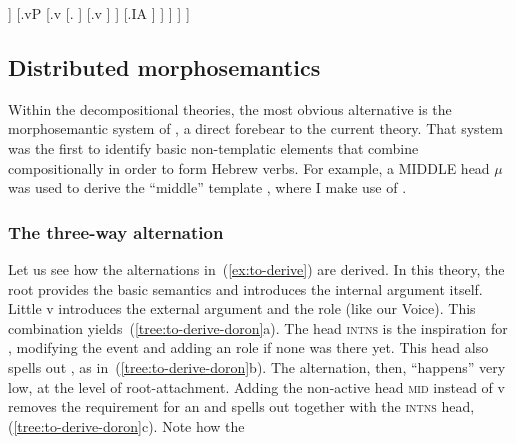 \begin{exe}
\begin{xlist}
\begin{xlist}
\begin{exe}
\begin{xlist}
\begin{xlist}
\begin{exe}
\begin{xlist}
\begin{xlist}
\begin{exe}
\begin{exe}
\begin{xlist}
\begin{exe}
\begin{exe}
\begin{xlist}
\begin{exe}
\begin{exe}
\begin{exe}
\begin{exe}
\begin{exe}
\begin{xlist}
\begin{exe}
\begin{xlist}
\begin{exe}
\begin{exe}
\begin{xlist}
\begin{exe}
\begin{xlist}
\begin{exe}
\begin{xlist}
\begin{exe}
\begin{exe}
\begin{exe}
\begin{xlist}
\begin{exe}
\begin{exe}
\begin{exe}
\begin{xlist}
\begin{exe}
\begin{xlist}
\begin{exe}
\begin{exe}
\begin{xlist}
\begin{exe}
\begin{exe}
\begin{exe}
\begin{exe}
\begin{xlist}
\begin{exe}
\begin{xlist}
\begin{exe}
\begin{xlist}
\begin{exe}
\begin{xlist}
\begin{exe}
\begin{xlist}
\begin{exe}
\begin{xlist}
\begin{exe}
\begin{exe}
\begin{xlist}
\begin{exe}
\begin{xlist}
\begin{exe}
\begin{exe}
\begin{xlist}
\begin{exe}
\begin{xlist}
\begin{exe}
\begin{exe}
\begin{exe}
\begin{exe}
\begin{xlist}
\begin{xlist}
\begin{exe}
\begin{xlist}
\begin{exe}
\begin{exe}
\begin{exe}
\begin{xlist}
\begin{exe}
\begin{exe}
\begin{xlist}
\begin{exe}
\begin{exe}
\begin{exe}
\begin{xlist}
\begin{xlist}
\begin{exe}
\begin{xlist}
\begin{exe}
\begin{exe}
\begin{exe}
\begin{exe}
\begin{xlist}
\begin{exe}
\begin{xlist}
\begin{exe}
\begin{xlist}
\begin{exe}
\begin{xlist}
\begin{exe}
\begin{exe}
\begin{exe}
\begin{exe}
\begin{exe}
\begin{xlist}
\begin{exe}
\begin{xlist}
\begin{exe}
\begin{xlist}
\begin{xlist}
\begin{exe}
\begin{xlist}
\begin{exe}
\begin{xlist}
]
							[.vP
								[.v
									[. ]
									[.v ]
								]
								[.IA ]
							]
						]
					]
				]			
 \z
\z 

	\subsection{Distributed morphosemantics \citep{doron03}} \label{vz:others:ed}
Within the decompositional theories, the most obvious alternative is the morphosemantic system of \cite{doron03}, a direct forebear to the current theory. That system was the first to identify basic non-templatic elements that combine compositionally in order to form Hebrew verbs. For example, a MIDDLE head $\mu$ was used to derive the ``middle'' template {\tnif}, where I make use of {\vz}.

		\subsubsection{The three-way alternation}
Let us see how the alternations in~(\ref{ex:to-derive}) are derived. In this theory, the root provides the basic semantics and introduces the internal argument itself. Little v introduces the external argument and the  role (like our Voice). This combination yields~(\ref{tree:to-derive-doron}a). The head \textsc{intns} is the inspiration for {\va}, modifying the event and adding an  role if none was there yet. This head also spells out {\tpie}, as in~(\ref{tree:to-derive-doron}b). The alternation, then, ``happens'' very low, at the level of root-attachment. Adding the non-active head \textsc{mid} instead of v removes the requirement for an  and spells out {\thit} together with the \textsc{intns} head, (\ref{tree:to-derive-doron}c). Note how the 
\end{xlist}
\end{exe}
\end{xlist}
\end{exe}
\end{xlist}
\end{xlist}
\end{exe}
\end{xlist}
\end{exe}
\end{xlist}
\end{exe}
\end{exe}
\end{exe}
\end{exe}
\end{exe}
\end{xlist}
\end{exe}
\end{xlist}
\end{exe}
\end{xlist}
\end{exe}
\end{xlist}
\end{exe}
\end{exe}
\end{exe}
\end{exe}
\end{xlist}
\end{exe}
\end{xlist}
\end{xlist}
\end{exe}
\end{exe}
\end{exe}
\end{xlist}
\end{exe}
\end{exe}
\end{xlist}
\end{exe}
\end{exe}
\end{exe}
\end{xlist}
\end{exe}
\end{xlist}
\end{xlist}
\end{exe}
\end{exe}
\end{exe}
\end{exe}
\end{xlist}
\end{exe}
\end{xlist}
\end{exe}
\end{exe}
\end{xlist}
\end{exe}
\end{xlist}
\end{exe}
\end{exe}
\end{xlist}
\end{exe}
\end{xlist}
\end{exe}
\end{xlist}
\end{exe}
\end{xlist}
\end{exe}
\end{xlist}
\end{exe}
\end{xlist}
\end{exe}
\end{exe}
\end{exe}
\end{exe}
\end{xlist}
\end{exe}
\end{exe}
\end{xlist}
\end{exe}
\end{xlist}
\end{exe}
\end{exe}
\end{exe}
\end{xlist}
\end{exe}
\end{exe}
\end{exe}
\end{xlist}
\end{exe}
\end{xlist}
\end{exe}
\end{xlist}
\end{exe}
\end{exe}
\end{xlist}
\end{exe}
\end{xlist}
\end{exe}
\end{exe}
\end{exe}
\end{exe}
\end{exe}
\end{xlist}
\end{exe}
\end{exe}
\end{xlist}
\end{exe}
\end{exe}
\end{xlist}
\end{xlist}
\end{exe}
\end{xlist}
\end{xlist}
\end{exe}
\end{xlist}
\end{xlist}
\end{exe}
